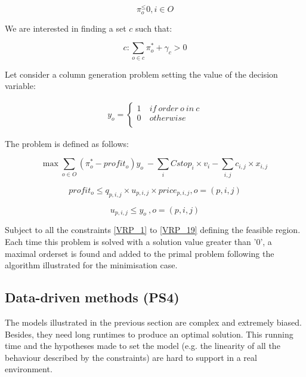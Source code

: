 \begin{equation}
    \pi_o^ \le0 , i\in O
\end{equation}

We are interested in finding a set $c$ such that:

\begin{equation}
    c:\sum_{o\in c}{\pi_o^\ast+\gamma_c>0}
\end{equation}

Let consider a column generation problem setting the value of the decision variable:

\begin{equation}
   \begin{split}
   y_o=\left\{
                \begin{array}{ll}
                  1\ & if\ order\ o\ in\ c \\
                  0 & otherwise\\
                \end{array}
              \right.
   \end{split}
\end{equation}

The problem is defined as follows:

\begin{equation}
    \max{\sum_{o\in O}{(\pi_o^\ast-profit_o)}y_o\ }-\sum_{i}{Cstop_i\times v_i}-\sum_{i,j}{c_{i,j}\times x_{i,j}\ }
\end{equation}

\begin{equation}
    profit_o\le q_{p,i,j}\times u_{p,i,j}\times price_{p,i,j} , o=\left(p,i,j\right)
\end{equation}

\begin{equation}
    u_{p,i,j}\le y_o\ , o=\left(p,i,j\right)
\end{equation}

Subject to all the constraints \ref{VRP_1} to \ref{VRP_19} defining the feasible region. Each time this problem is solved with a solution value greater than '0', a maximal orderset is found and added to the primal problem following the algorithm illustrated for the minimisation case.

\subsection{Data-driven methods (PS4)} \label{secDataDrivenRouting}

The models illustrated in the previous section are complex and extremely biased. Besides, they need long runtimes to produce an optimal solution. This running time and the hypotheses made to set the model (e.g. the linearity of all the behaviour described by the constraints) are hard to support in a real environment. \par


